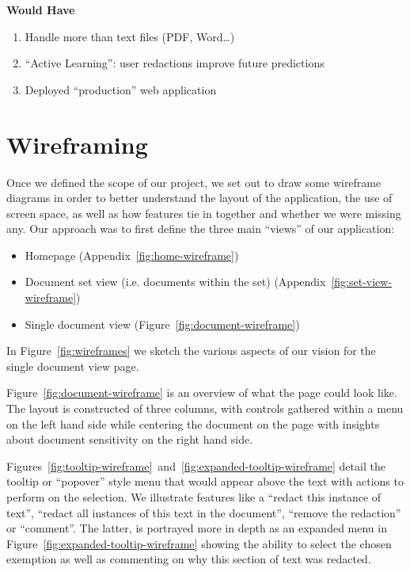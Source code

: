 \documentclass[\version]{l4proj}
\begin{document}
\begin{adjustbox}{width=\textwidth,center}
    \begin{minipage}[t]{\linewidth}
        \centerline{\textbf{Would Have}}
        \begin{enumerate}[noitemsep,nolistsep,label=\textbf{W\arabic*}]
            \item Handle more than text files (PDF, Word\ldots)
            \item ``Active Learning'': user redactions improve future predictions
            \item Deployed ``production'' web application
        \end{enumerate}
    \end{minipage}
\end{adjustbox}

\section{Wireframing}

Once we defined the scope of our project, we set out to draw some wireframe diagrams in order to better understand the layout of the application, the use of screen space, as well as how features tie in together and whether we were missing any.
Our approach was to first define the three main ``views'' of our application:

\begin{itemize}[noitemsep,nolistsep]
    \item Homepage (Appendix~\ref{fig:home-wireframe})
    \item Document set view (i.e. documents within the set) (Appendix~\ref{fig:set-view-wireframe})
    \item Single document view (Figure~\ref{fig:document-wireframe})
\end{itemize}

In Figure~\ref{fig:wireframes} we sketch the various aspects of our vision for the single document view page.

Figure~\ref{fig:document-wireframe} is an overview of what the page could look like.
The layout is constructed of three columns, with controls gathered within a menu on the left hand side while centering the document on the page with insights about document sensitivity on the right hand side.

Figures~\ref{fig:tooltip-wireframe}~and~\ref{fig:expanded-tooltip-wireframe} detail the tooltip or ``popover'' style menu that would appear above the text with actions to perform on the selection.
We illustrate features like a ``redact this instance of text'', ``redact all instances of this text in the document'', ``remove the redaction'' or ``comment''.
The latter, is portrayed more in depth as an expanded menu in Figure~\ref{fig:expanded-tooltip-wireframe} showing the ability to select the chosen exemption as well as commenting on why this section of text was redacted.
\end{document}
